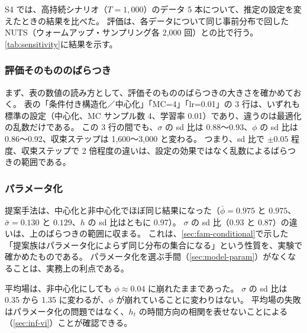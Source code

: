S4 では、高持続シナリオ（$T = 1{,}000$）のデータ 5 本について、推定の設定を変えたときの結果を比べた。
評価は、各データについて同じ事前分布で回した NUTS（ウォームアップ・サンプリング各 2,000 回）との比で行う。
\cref{tab:sensitivity}に結果を示す。

\begin{table}[tbp]
  \centering
  \caption{設定への感度（S4、高持続シナリオ、$T = 1{,}000$、5 本）。
    $\bar\phi$・$\bar\sigma$ は事後平均の 5 本の平均（真値は 0.99・0.10）、sd 比は NUTS に対する事後標準偏差の比の中央値、
    $h$ の RMSE は真値に対する値の平均、収束 step は ELBO が収束したステップの中央値。
    「中心化」「MC=4」「lr=0.01」は同じ標準の設定を別の乱数で回したものである。}
  \label{tab:sensitivity}
  \footnotesize
  \setlength{\tabcolsep}{3.5pt}
  
\end{table}

\subsubsection{評価そのもののばらつき}

まず、表の数値の読み方として、評価そのもののばらつきの大きさを確かめておく。
表の「条件付き構造化／中心化」「MC=4」「lr=0.01」の 3 行は、いずれも標準の設定（中心化、MC サンプル数 4、学習率 0.01）であり、違うのは最適化の乱数だけである。
この 3 行の間でも、$\sigma$ の sd 比は 0.88〜0.93、$\phi$ の sd 比は 0.86〜0.92、収束ステップは 1,600〜3,000 と変わる。
つまり、sd 比で $\pm 0.05$ 程度、収束ステップで 2 倍程度の違いは、設定の効果ではなく乱数によるばらつきの範囲である。

\subsubsection{パラメータ化}

提案手法は、中心化と非中心化でほぼ同じ結果になった（$\bar\phi = 0.975$ と $0.975$、$\bar\sigma = 0.130$ と $0.129$、$h$ の sd 比はともに 0.97）。
$\sigma$ の sd 比（0.93 と 0.87）の違いは、上のばらつきの範囲に収まる。
これは、\cref{sec:fam-conditional}で示した「提案族はパラメータ化によらず同じ分布の集合になる」という性質を、実験で確かめたものである。
パラメータ化を選ぶ手間（\cref{sec:model-param}）がなくなることは、実務上の利点である。

平均場は、非中心化にしても $\phi \approx 0.04$ に崩れたままであった。
$\sigma$ の sd 比は 0.35 から 1.35 に変わるが、$\phi$ が崩れていることに変わりはない。
平均場の失敗はパラメータ化の問題ではなく、$h_t$ の時間方向の相関を表せないことによる（\cref{sec:inf-vi}）ことが確認できる。


